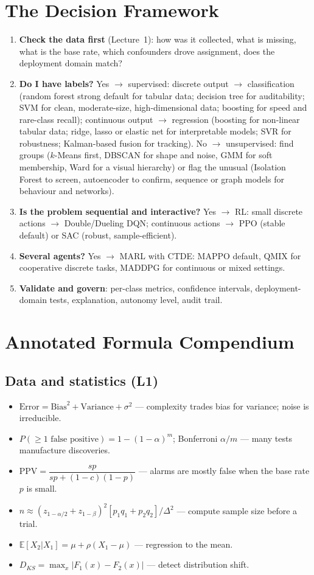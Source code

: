 \documentclass[11pt]{article}
\begin{document}
\section{The Decision Framework}
\begin{enumerate}
\item \textbf{Check the data first} (Lecture~1): how was it collected, what is missing, what is the base rate, which confounders drove assignment, does the deployment domain match?
\item \textbf{Do I have labels?} Yes $\to$ supervised: discrete output $\to$ classification (random forest strong default for tabular data; decision tree for auditability; SVM for clean, moderate-size, high-dimensional data; boosting for speed and rare-class recall); continuous output $\to$ regression (boosting for non-linear tabular data; ridge, lasso or elastic net for interpretable models; SVR for robustness; Kalman-based fusion for tracking). No $\to$ unsupervised: find groups ($k$-Means first, DBSCAN for shape and noise, GMM for soft membership, Ward for a visual hierarchy) or flag the unusual (Isolation Forest to screen, autoencoder to confirm, sequence or graph models for behaviour and networks).
\item \textbf{Is the problem sequential and interactive?} Yes $\to$ RL: small discrete actions $\to$ Double/Dueling DQN; continuous actions $\to$ PPO (stable default) or SAC (robust, sample-efficient).
\item \textbf{Several agents?} Yes $\to$ MARL with CTDE: MAPPO default, QMIX for cooperative discrete tasks, MADDPG for continuous or mixed settings.
\item \textbf{Validate and govern}: per-class metrics, confidence intervals, deployment-domain tests, explanation, autonomy level, audit trail.
\end{enumerate}

\section{Annotated Formula Compendium}
\subsection{Data and statistics (L1)}
\begin{itemize}
\item $\text{Error}=\text{Bias}^2+\text{Variance}+\sigma^2$ --- complexity trades bias for variance; noise is irreducible.
\item $P(\ge1\text{ false positive})=1-(1-\alpha)^m$; Bonferroni $\alpha/m$ --- many tests manufacture discoveries.
\item $\text{PPV}=\dfrac{sp}{sp+(1-c)(1-p)}$ --- alarms are mostly false when the base rate $p$ is small.
\item $n\approx(z_{1-\alpha/2}+z_{1-\beta})^2[p_1q_1+p_2q_2]/\Delta^2$ --- compute sample size before a trial.
\item $\mathbb E[X_2|X_1]=\mu+\rho(X_1-\mu)$ --- regression to the mean.
\item $D_{KS}=\max_x|F_1(x)-F_2(x)|$ --- detect distribution shift.
\end{itemize}
\end{document}
